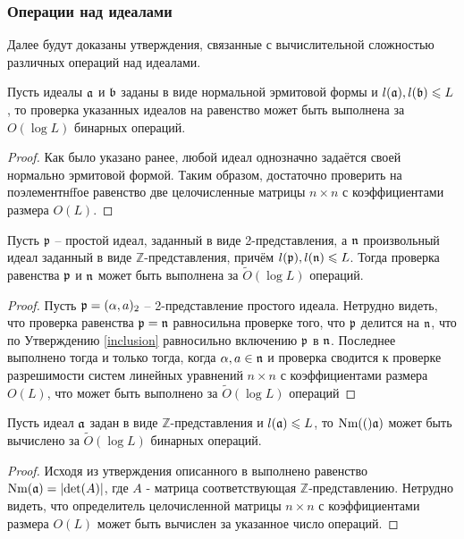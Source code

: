 \documentclass[_00_dissertation.tex]{subfiles}
\begin{document}
\subsubsection{Операции над идеалами}

Далее будут доказаны утверждения, связанные с вычислительной сложностью различных операций над идеалами.

\begin{statement}\label{equality}
    Пусть идеалы $\mathfrak{a}$ и $\mathfrak{b}$ заданы в виде нормальной эрмитовой формы и $l(\mathfrak{a}), l(\mathfrak{b}) \leqslant L$, то проверка указанных идеалов на равенство может быть выполнена за $O(\log L)$ бинарных операций.
\end{statement}
\begin{proof}
    Как было указано ранее, любой идеал однозначно задаётся своей нормально эрмитовой формой.
    Таким образом, достаточно проверить на поэлементнffое равенство две целочисленные матрицы $n \times n$ с коэффициентами размера $O(L)$.
\end{proof}

\begin{statement}\label{particular_equality}
    Пусть $\mathfrak{p}$ -- простой идеал, заданный в виде 2-представления, а $\mathfrak{n}$ произвольный идеал заданный в виде $\mathbb{Z}$-представления, причём $l(\mathfrak{p}), l(\mathfrak{n}) \leqslant L$.
    Тогда проверка равенства $\mathfrak{p}$ и $\mathfrak{n}$ может быть выполнена за $\tilde{O}(\log L)$ операций.
\end{statement}
\begin{proof}
    Пусть $\mathfrak{p} = (\alpha, a)_2$ -- 2-представление простого идеала. Нетрудно видеть, что проверка равенства $\mathfrak{p} = \mathfrak{n}$ равносильна проверке того, что $\mathfrak{p}$ делится на $\mathfrak{n}$, что по Утверждению \ref{inclusion} равносильно включению $\mathfrak{p}$ в $\mathfrak{n}$. Последнее выполнено тогда и только тогда, когда $\alpha, a \in \mathfrak{n}$ и проверка сводится к проверке разрешимости систем линейных уравнений $n \times n$ с коэффициентами размера $O(L)$, что может быть выполнено за $\tilde{O}(\log L)$ операций
\end{proof}

\begin{statement}\label{norm}
    Пусть идеал $\mathfrak{a}$ задан в виде $\mathbb{Z}$-представления и $l(\mathfrak{a}) \leqslant L$, то $\textrm{Nm}(()\mathfrak{a})$ может быть вычислено за $\tilde{O}(\log L)$ бинарных операций.
\end{statement}
\begin{proof}
    Исходя из утверждения описанного в \cite{Post} выполнено равенство $\textrm{Nm}(\mathfrak{a}) = |\mathrm{det}(A)|$, где $A$ - матрица соответствующая $\mathbb{Z}$-представлению.
    Нетрудно видеть, что определитель целочисленной матрицы $n \times n$ с коэффициентами размера $O(L)$  может быть вычислен за указанное число операций.
\end{proof}
\end{document}
